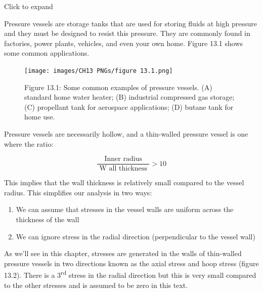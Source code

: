 \documentclass[
  letterpaper,
  DIV=11,
  numbers=noendperiod]{scrreprt}
\providecommand{\tightlist}{%
  \setlength{\itemsep}{0pt}\setlength{\parskip}{0pt}}\usepackage{longtable,booktabs,array}
\begin{document}
Click to expand

Pressure vessels are storage tanks that are used for storing fluids at
high pressure and they must be designed to resist this pressure. They
are commonly found in factories, power plants, vehicles, and even your
own home. Figure 13.1 shows some common applications.

\begin{figure}[H]

{\centering \texttt{[image: images/CH13 PNGs/figure 13.1.png]}

}

\caption{Figure 13.1: Some common examples of pressure vessels. (A)
standard home water heater; (B) industrial compressed gas storage; (C)
propellant tank for aerospace applications; (D) butane tank for home
use.}

\end{figure}%

Pressure vessels are necessarily hollow, and a thin-walled pressure
vessel is one where the ratio:

\[
\frac{\text { Inner radius }}{\text { W all thickness }}>10
\]

This implies that the wall thickness is relatively small compared to the
vessel radius. This simplifies our analysis in two ways:

\begin{enumerate}
\def\labelenumi{\arabic{enumi}.}
\tightlist
\item
  We can assume that stresses in the vessel walls are uniform across the
  thickness of the wall
\item
  We can ignore stress in the radial direction (perpendicular to the
  vessel wall)
\end{enumerate}

As we'll see in this chapter, stresses are generated in the walls of
thin-walled pressure vessels in two directions known as the axial stress
and hoop stress (figure 13.2). There is a 3\textsuperscript{rd} stress
in the radial direction but this is very small compared to the other
stresses and is assumed to be zero in this text.
\end{document}

